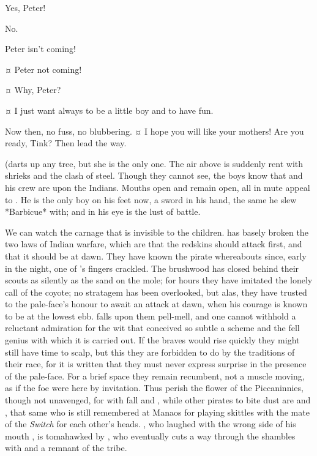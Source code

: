 \begin{drama}
\wendyspeaks
Yes, Peter!

\peterspeaks
No.


\wendyspeaks
Peter isn’t coming!


\johnspeaks {}¤
Peter not coming!

\tootlesspeaks {}¤
Why, Peter?

\peterspeaks {}¤
I just want always to be a little boy and to have fun.


\speakercontinues
Now then, no fuss, no blubbering.
¤
I hope you will like your mothers!
Are you ready, Tink?
Then lead the way.

\begin{stagedir}
(\tink darts up any tree, but she is the only one.
The air above is suddenly rent with shrieks and the clash of steel.
Though they cannot see, the boys know that \hook and his crew are upon the Indians.
Mouths open and remain open, all in mute appeal to \peter.
He is the only boy on his feet now, a sword in his hand, the same he slew *Barbicue* with;
and in his eye is the lust of battle.

We can watch the carnage that is invisible to the children.
\hook has basely broken the two laws of Indian warfare,
which are that the redskins should attack first, and that it should be at dawn.
They have known the pirate whereabouts since, early in the night, one of \smee’s fingers crackled.
The brushwood has closed behind their scouts as silently as the sand on the mole;
for hours they have imitated the lonely call of the coyote;
no stratagem has been overlooked, but alas, they have trusted to the pale-face’s honour to await an attack at dawn,
when his courage is known to be at the lowest ebb.
\hook falls upon them pell-mell,
and one cannot withhold a reluctant admiration for the wit that conceived so subtle a scheme
and the fell genius with which it is carried out.
If the braves would rise quickly they might still have time to scalp,
but this they are forbidden to do by the traditions of their race,
for it is written that they must never express surprise in the presence of the pale-face.
For a brief space they remain recumbent, not a muscle moving, as if the foe were here by invitation.
Thus perish the flower of the Piccaninnies, though not unavenged,
for with  fall  and ,
while other pirates to bite dust are  and ,
that same  who is still remembered at Manaos
for playing skittles with the mate of the \emph{Switch} for each other’s heads.
, who laughed with the wrong side of his mouth ,
is tomahawked by \panther,
who eventually cuts a way through the shambles with \tigerlily and a remnant of the tribe.


\end{stagedir}
\end{drama}
